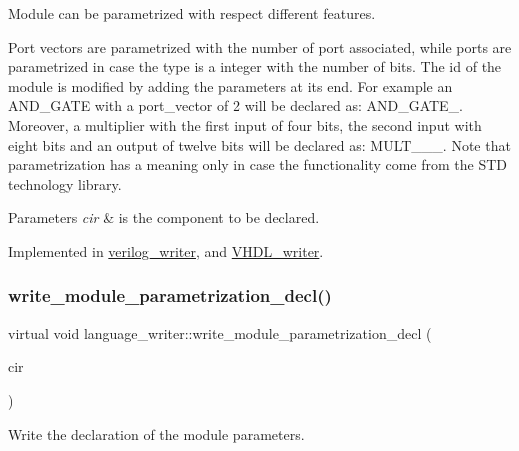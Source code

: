 Module can be parametrized with respect different features. 

Port vectors are parametrized with the number of port associated, while ports are parametrized in case the type is a integer with the number of bits. The id of the module is modified by adding the parameters at its end. For example an A\+N\+D\+\_\+\+G\+A\+TE with a port\+\_\+vector of 2 will be declared as\+: A\+N\+D\+\_\+\+G\+A\+T\+E\+\_. Moreover, a multiplier with the first input of four bits, the second input with eight bits and an output of twelve bits will be declared as\+: M\+U\+L\+T\+\_\+\_\+\_. Note that parametrization has a meaning only in case the functionality come from the S\+TD technology library. 
\begin{DoxyParams}{Parameters}
{\em cir} & is the component to be declared. \\
\hline
\end{DoxyParams}


Implemented in \hyperlink{classverilog__writer_aa097c810dcf1d52f5559ad89def6da17}{verilog\+\_\+writer}, and \hyperlink{structVHDL__writer_ad9ae71cdd9eefe75ccaffac7aad2c909}{V\+H\+D\+L\+\_\+writer}.

\mbox{\label{classlanguage__writer_ad14ee8909894bca0a7d8874554d91d9b}} 
\subsubsection{\texorpdfstring{write\+\_\+module\+\_\+parametrization\+\_\+decl()}{write\_module\_parametrization\_decl()}}
{\footnotesize\ttfamily virtual void language\+\_\+writer\+::write\+\_\+module\+\_\+parametrization\+\_\+decl (\begin{DoxyParamCaption}\item[{const \hyperlink{structural__objects_8hpp_a8ea5f8cc50ab8f4c31e2751074ff60b2}{structural\+\_\+object\+Ref} \&}]{cir }\end{DoxyParamCaption})\hspace{0.3cm}{\ttfamily [pure virtual]}}



Write the declaration of the module parameters. 



